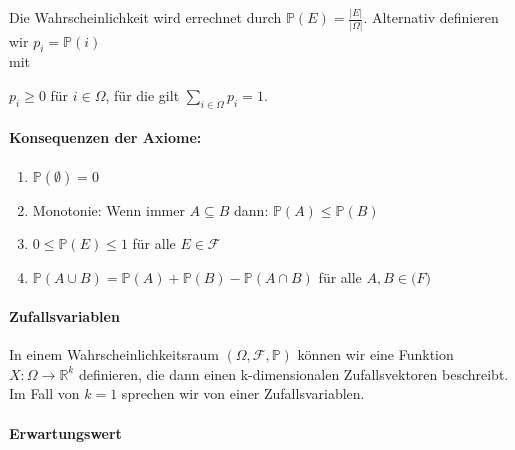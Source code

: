 \vspace{5pt}

Die Wahrscheinlichkeit wird errechnet durch $ \mathbb{P}(E) = \frac {|E|}{|\Omega|}$.
Alternativ definieren wir $p_{i} = \mathbb{P} ({i})$\\ 
mit

$p_{i} \geq 0$  f\"ur $i \in \Omega$, f\"ur die gilt $\sum_{i\in \Omega} p_{i} =1$. 



\vspace{10pt}

\paragraph{Konsequenzen der Axiome:}

\vspace{5pt}

\begin{enumerate}
	\item $\mathbb{P} (\emptyset) = 0$
	\item Monotonie: Wenn immer $A\subseteq B$ dann: $\mathbb{P} (A) \leq \mathbb{P} (B)$
	\item $0 \leq \mathbb{P} (E) \leq 1$ \: f\"ur alle $E \in \mathcal{F}$
	\item $ \mathbb{P} (A \cup B) = \mathbb{P} (A) + \mathbb{P} (B) - \mathbb{P} (A \cap B)$ f\"ur alle $A,B \in \mathcal(F)$
\end{enumerate}


\vspace{10pt}

\paragraph {Zufallsvariablen}

\vspace{5pt}

In einem Wahrscheinlichkeitsraum $(\Omega, \mathcal{F}, \mathbb{P})$ k\"onnen wir eine Funktion $X:\Omega \longrightarrow \mathbb{R}^k$\: definieren, die dann einen k-dimensionalen Zufallsvektoren beschreibt. Im Fall von $k=1$ sprechen wir von einer Zufallsvariablen.

\vspace{10pt}

\paragraph {Erwartungswert}

